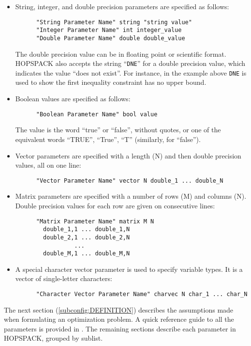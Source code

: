 \begin{itemize}
\item
String, integer, and double precision parameters are specified as follows:
\begin{verbatim}
      "String Parameter Name" string "string value"
      "Integer Parameter Name" int integer_value
      "Double Parameter Name" double double_value
\end{verbatim}
The double precision value can be in floating point or scientific format.
HOPSPACK also accepts the string ``{\tt DNE}'' for a double precision value,
which indicates the value ``does not exist''.  For instance, in the example above
{\tt DNE} is used to show the first inequality constraint has no upper bound.

\item
Boolean values are specified as follows:
\begin{verbatim}
      "Boolean Parameter Name" bool value
\end{verbatim}
The value is the word ``true'' or ``false'', without quotes, or one of the
equivalent words ``TRUE'', ``True'', ``T'' (similarly, for ``false'').

\item
Vector parameters are specified with a length (N) and then double precision
values, all on one line:
\begin{verbatim}
      "Vector Parameter Name" vector N double_1 ... double_N
\end{verbatim}

\item
Matrix parameters are specified with a number of rows (M) and columns (N).
Double precision values for each row are given on consecutive lines:
\begin{verbatim}
      "Matrix Parameter Name" matrix M N
        double_1,1 ... double_1,N
        double_2,1 ... double_2,N
                 ...
        double_M,1 ... double_M,N
\end{verbatim}

\item
A special character vector parameter is used to specify variable types.
It is a vector of single-letter characters:
\begin{verbatim}
      "Character Vector Parameter Name" charvec N char_1 ... char_N
\end{verbatim}

\end{itemize}

The next section (\ref{subconfig:DEFINITION}) describes the
assumptions made when formulating an optimization problem. A
quick reference guide to all the parameters is provided in
. The remaining sections
describe each parameter in HOPSPACK, grouped by sublist.


